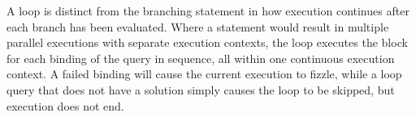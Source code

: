 A  loop is distinct from the branching  statement in how execution
continues after each branch has been evaluated. Where a  statement would
result in multiple parallel executions with separate execution contexts, the
 loop executes the block for each binding of the query in sequence,
all within one continuous execution context. A failed  binding will cause
the current execution to fizzle, while a  loop query that does not
have a solution simply causes the loop to be skipped, but execution does not end.
